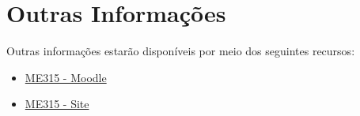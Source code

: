 \documentclass[paper=letter, fontsize=12pt]{scrartcl} %
\begin{document}
\section{Outras Informações}

Outras informações estarão disponíveis por meio dos seguintes recursos:

\begin{itemize}
\item \href{https://moodle.ggte.unicamp.br/course/view.php?id=14890}{{\color{blue} ME315 - Moodle}}
\item \href{https://me315-unicamp.github.io}{{\color{blue} ME315 - Site}}
\end{itemize}
\end{document}
